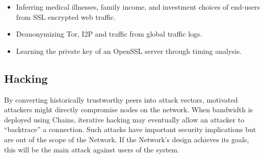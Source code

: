 \begin{itemize}
\item Inferring medical illnesses, family income, and investment choices of end-users from SSL encrypted web traffic\cite{broadInferenceAttacks}.
\item Deanonymizing Tor, I2P and \Orchid{} traffic from global traffic logs\cite{mixTrafficAnalysis}.
\item Learning the private key of an OpenSSL server through timing analysis\cite{opensslTimingAttack}.
\end{itemize}

\subsection{Hacking}

By converting historically trustworthy peers into attack vectors, motivated attackers might directly compromise nodes on the network. When bandwidth is deployed using Chains, iterative hacking may eventually allow an attacker to ``backtrace'' a connection. Such attacks have important security implications but are out of the scope of the \Orchid{} Network. If the \Orchid{} Network's design achieves its goals, this will be the main attack against users of the system.
